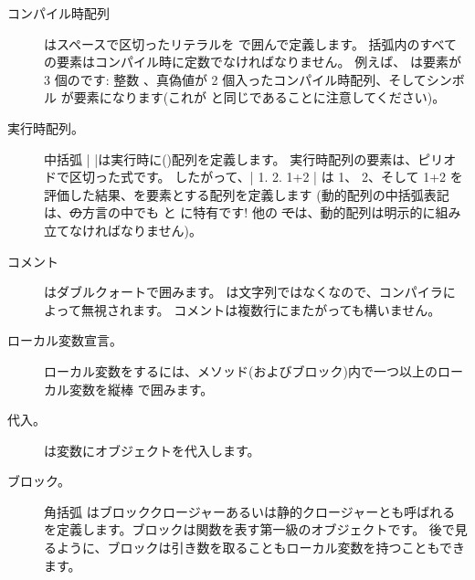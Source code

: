 \documentclass[a4paper,10pt,twoside]{book}
\begin{document}
\begin{description}
\item[コンパイル時配列] はスペースで区切ったリテラルを \ct{#( )} で囲んで定義します。
		括弧内のすべての要素はコンパイル時に定数でなければなりません。
		例えば、 は要素が 3 個のです: 整数 、真偽値が 2 個入ったコンパイル時配列、そしてシンボル  が要素になります(これが  と同じであることに注意してください)。

\item[実行時配列。] 中括弧 \ct|{ }|は実行時に()配列を定義します。
		実行時配列の要素は、ピリオドで区切った式です。
		したがって、\ct|{ 1. 2. 1+2 }| は 1、 2、そして 1+2 を評価した結果、を要素とする配列を定義します
		(動的配列の中括弧表記は、\st の方言の中でも \pharo と \squeak に特有です!
		他の \st では、動的配列は明示的に組み立てなければなりません)。

\item[コメント] はダブルクォートで囲みます。
		 は文字列ではなくなので、\pharo コンパイラによって無視されます。
		コメントは複数行にまたがっても構いません。
		
\item[ローカル変数宣言。] ローカル変数をするには、メソッド(およびブロック)内で一つ以上のローカル変数を縦棒 \ct{| |} で囲みます。

\item[代入。] \ct{:=} は変数にオブジェクトを代入します。

\item[ブロック。] 角括弧 \ct{[ ]} はブロッククロージャーあるいは静的クロージャーとも呼ばれるを定義します。ブロックは関数を表す第一級のオブジェクトです。
		後で見るように、ブロックは引き数を取ることもローカル変数を持つこともできます。


\end{description}
\end{document}

